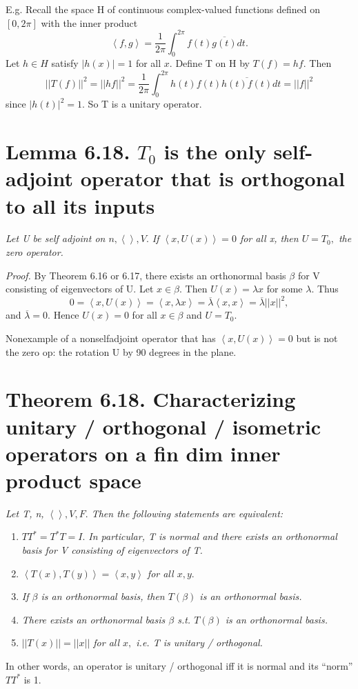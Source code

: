 \documentclass[12pt,english]{article}
\begin{document}
E.g. Recall the space H of continuous complex-valued functions defined
on $[0,2\pi]$ with the inner product
\[
\left\langle f,g\right\rangle =\frac{1}{2\pi}\int_{0}^{2\pi}f(t)\overline{g(t)}dt.
\]
 Let $h\in H$ satisfy $\left|h(x)\right|=1$ for all $x.$ Define
T on H by $T(f)=hf.$ Then
\[
\left|\left|T(f)\right|\right|^{2}=\left|\left|hf\right|\right|^{2}=\frac{1}{2\pi}\int_{0}^{2\pi}h(t)f(t)\overline{h(t)f(t)}dt=\left|\left|f\right|\right|^{2}
\]
since $\left|h(t)\right|^{2}=1.$ So T is a unitary operator.

\section{Lemma 6.18. $T_{0}$ is the only self-adjoint operator that is orthogonal
to all its inputs}

\emph{Let U be self adjoint on $n,\left\langle \right\rangle ,V.$
If $\left\langle x,U(x)\right\rangle =0$ for all x, then $U=T_{0},$
the zero operator.}

\emph{Proof. }By Theorem 6.16 or 6.17, there exists an orthonormal
basis $\beta$ for V consisting of eigenvectors of U. Let $x\in\beta.$
Then $U(x)=\lambda x$ for some $\lambda.$ Thus
\[
0=\left\langle x,U(x)\right\rangle =\left\langle x,\lambda x\right\rangle =\overline{\lambda}\left\langle x,x\right\rangle =\overline{\lambda}\left|\left|x\right|\right|^{2},
\]
and $\overline{\lambda}=0.$ Hence $U(x)=0$ for all $x\in\beta$
and $U=T_{0}.$

Nonexample of a nonselfadjoint operator that has $\left\langle x,U(x)\right\rangle =0$
but is not the zero op: the rotation U by 90 degrees in the plane.

\section{Theorem 6.18. Characterizing unitary / orthogonal / isometric operators
on a fin dim inner product space}

\emph{Let T, n, $\left\langle \right\rangle ,V,F.$ Then the following
statements are equivalent:}
\begin{enumerate}
\item \emph{$TT^{*}=T^{*}T=I.$ In particular, T is normal and there exists
an orthonormal basis for V consisting of eigenvectors of T.}
\item \emph{$\left\langle T(x),T(y)\right\rangle =\left\langle x,y\right\rangle $
for all $x,y.$}
\item \emph{If $\beta$ is an orthonormal basis, then $T(\beta)$ is an
orthonormal basis.}
\item \emph{There exists an orthonormal basis $\beta$ s.t. $T(\beta)$
is an orthonormal basis.}
\item \emph{$\left|\left|T(x)\right|\right|=\left|\left|x\right|\right|$
for all $x,$ i.e. T is unitary / orthogonal.}
\end{enumerate}
In other words, an operator is unitary / orthogonal iff it is normal
and its ``norm'' $TT^{*}$ is 1.
\end{document}
